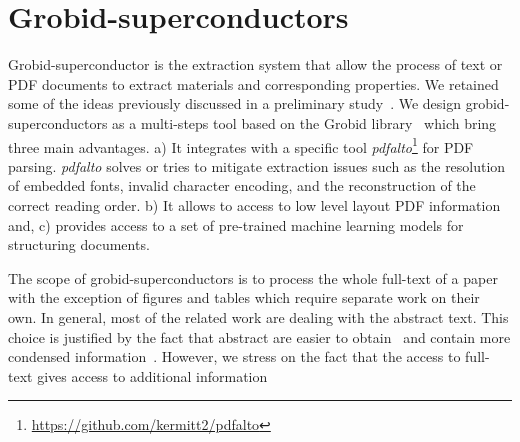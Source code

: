 \documentclass{article}
\begin{document}


\section{Grobid-superconductors}

Grobid-superconductor is the extraction system that allow the process of text or PDF documents to extract materials and corresponding properties. 
We retained some of the ideas previously discussed in a preliminary study~\cite{foppiano:hal-02870896}.  
We design grobid-superconductors as a multi-steps tool based on the Grobid library~\cite{GROBID} which bring three main advantages. 
a) It integrates with a specific tool \textit{pdfalto}\footnote{\url{https://github.com/kermitt2/pdfalto}} for PDF parsing. \textit{pdfalto} solves or tries to mitigate extraction issues such as the resolution of embedded fonts, invalid character encoding, and the reconstruction of the correct reading order. 
b) It allows to access to low level layout PDF information and, c) provides access to a set of pre-trained machine learning models for structuring documents.

The scope of grobid-superconductors is to process the whole full-text of a paper with the exception of figures and tables which require separate work on their own. 
In general, most of the related work are dealing with the abstract text. This choice is  justified by the fact that abstract are easier to obtain~\cite{kononova_text-mined_2019} and contain more condensed information~\cite{yamaguchi-etal-2020-sc, court_magnetic_2020}. However, we stress on the fact that the access to full-text gives access to additional information 
\end{document}
